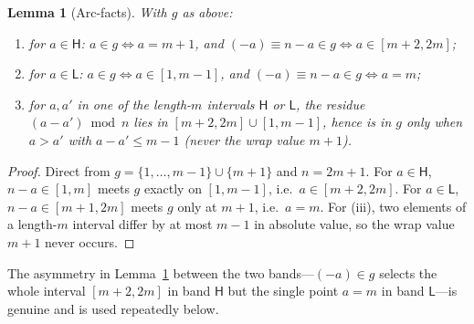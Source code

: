 \documentclass[11pt]{article}
\newcommand{\Hi}{\mathsf{H}}
\newcommand{\Lo}{\mathsf{L}}
\theoremstyle{plain}
\newtheorem{lemma}{Lemma}
\theoremstyle{definition}
\begin{document}
\begin{lemma}[Arc-facts]\label{lem:arc}
With $g$ as above:
\begin{enumerate}[label=\textup{(\roman*)}]
\item for $a\in\Hi$: $a\in g\iff a=m+1$, and $(-a)\equiv n-a\in g\iff a\in[m+2,2m]$;
\item for $a\in\Lo$: $a\in g\iff a\in[1,m-1]$, and $(-a)\equiv n-a\in g\iff a=m$;
\item for $a,a'$ in one of the length-$m$ intervals $\Hi$ or $\Lo$, the residue $(a-a')\bmod n$
lies in $[m+2,2m]\cup[1,m-1]$, hence is in $g$ only when $a>a'$ with $a-a'\le m-1$ (never the
wrap value $m+1$).
\end{enumerate}
\end{lemma}
\begin{proof}
Direct from $g=\{1,\dots,m-1\}\cup\{m+1\}$ and $n=2m+1$. For $a\in\Hi$, $n-a\in[1,m]$ meets $g$
exactly on $[1,m-1]$, i.e.\ $a\in[m+2,2m]$. For $a\in\Lo$, $n-a\in[m+1,2m]$ meets $g$ only at
$m+1$, i.e.\ $a=m$. For (iii), two elements of a length-$m$ interval differ by at most $m-1$ in
absolute value, so the wrap value $m+1$ never occurs.
\end{proof}

The asymmetry in Lemma~\ref{lem:arc} between the two bands---$(-a)\in g$ selects the whole
interval $[m+2,2m]$ in band $\Hi$ but the single point $a=m$ in band $\Lo$---is genuine and is
used repeatedly below.
\end{document}
